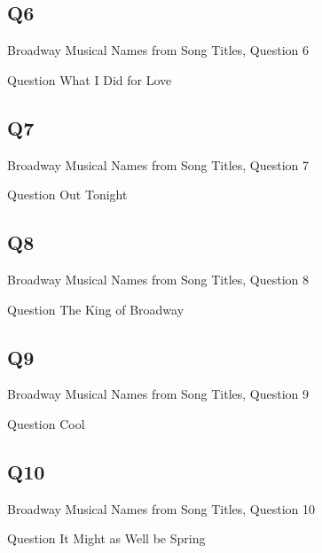 \documentclass[11pt]{beamer}
\begin{document}
\subsection*{Q6}
\begin{frame}[t]{Broadway Musical Names from Song Titles, Question 6}
\begin{block}{Question}
What I Did for Love
\end{block}
\end{frame}
\subsection*{Q7}
\begin{frame}[t]{Broadway Musical Names from Song Titles, Question 7}
\begin{block}{Question}
Out Tonight
\end{block}
\end{frame}
\subsection*{Q8}
\begin{frame}[t]{Broadway Musical Names from Song Titles, Question 8}
\begin{block}{Question}
The King of Broadway
\end{block}
\end{frame}
\subsection*{Q9}
\begin{frame}[t]{Broadway Musical Names from Song Titles, Question 9}
\begin{block}{Question}
Cool
\end{block}
\end{frame}
\subsection*{Q10}
\begin{frame}[t]{Broadway Musical Names from Song Titles, Question 10}
\begin{block}{Question}
It Might as Well be Spring
\end{block}
\end{frame}
\end{document}
